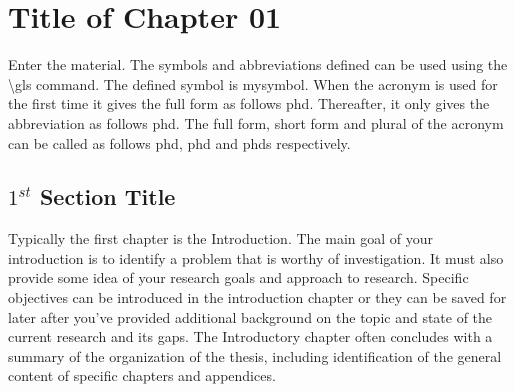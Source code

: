 
\newpage
{}



\chapter{Title of Chapter 01}
\label{yyyyy}

{Enter the material. The symbols and abbreviations defined can be used using the \textbackslash gls command. The defined symbol is \gls{mysymbol}. When the acronym is used for the first time it gives the full form as follows \gls{phd}. Thereafter, it only gives the abbreviation as follows \gls{phd}. The full form, short form and plural of the acronym can be called as follows \acrfull{phd}, \acrshort{phd} and \glspl{phd} respectively.



\section{$1^{st}$ Section Title}
\label{yyyyy}

{Typically the first chapter is the Introduction. The main goal of your introduction is to identify a problem that is worthy of investigation. It must also provide some idea of your research goals and approach to research.  Specific objectives can be introduced in the introduction chapter or they can be saved for later after you've provided additional background on the topic and state of the current research and its gaps.  The Introductory chapter often concludes with a summary of the organization of the thesis, including identification of the general content of specific chapters and appendices.}


}
